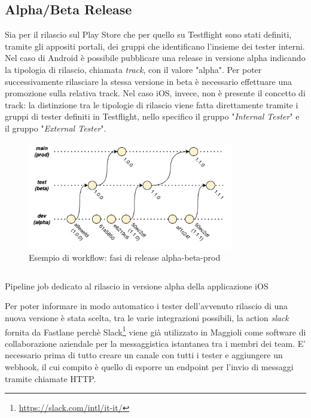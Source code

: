\subsection{Alpha/Beta Release}
Sia per il rilascio sul Play Store che per quello su Testflight sono stati definiti, tramite gli appositi portali, dei gruppi che identificano l'insieme dei tester interni. Nel caso di Android è possibile pubblicare una release in versione alpha indicando la tipologia di rilascio, chiamata \textit{track}, con il valore "alpha". Per poter successivamente rilasciare la stessa versione in beta è necessario effettuare una promozione sulla relativa track. Nel caso iOS, invece, non è presente il concetto di track: la distinzione tra le tipologie di rilascio viene fatta direttamente tramite i gruppi di tester definiti in Testflight, nello specifico il gruppo "\textit{Internal Tester}" e il gruppo "\textit{External Tester}".

\begin{figure}[H]
\centering
\includegraphics[width=0.8\textwidth]{img/tesi-18-release-flow.drawio.png}
\caption{Esempio di workflow: fasi di release alpha-beta-prod}
\end{figure}

\begin{listing}[H]
\inputminted{yaml}{code/4-ios-alpha}
\caption{Pipeline job dedicato al rilascio in versione alpha della applicazione iOS}
\end{listing}

Per poter informare in modo automatico i tester dell'avvenuto rilascio di una nuova versione è stata scelta, tra le varie integrazioni possibili, la action \textit{slack} fornita da Fastlane perchè Slack\footnote{\url{https://slack.com/intl/it-it/}} viene già utilizzato in Maggioli come software di collaborazione aziendale per la messaggistica istantanea tra i membri dei team. E' necessario prima di tutto creare un canale con tutti i tester e aggiungere un webhook, il cui compito è quello di esporre un endpoint per l'invio di messaggi tramite chiamate HTTP.

